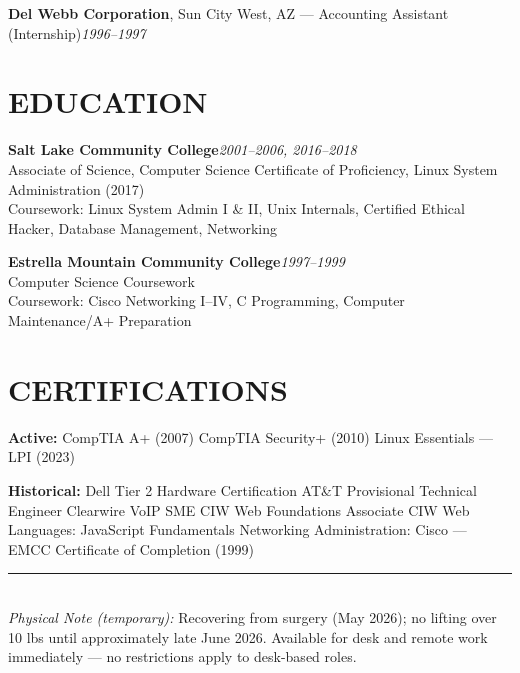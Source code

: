 \documentclass[9pt,letterpaper]{extarticle}
\begin{document}
\vspace{3pt}
\noindent\textbf{Del Webb Corporation}, Sun City West, AZ --- Accounting Assistant (Internship)\hfill\textit{1996--1997}

\section*{EDUCATION}

\noindent\textbf{Salt Lake Community College}\hfill\textit{2001--2006, 2016--2018}\\
Associate of Science, Computer Science \textbullet{} Certificate of Proficiency, Linux System Administration (2017)\\
Coursework: Linux System Admin I \& II, Unix Internals, Certified Ethical Hacker, Database Management, Networking

\vspace{4pt}
\noindent\textbf{Estrella Mountain Community College}\hfill\textit{1997--1999}\\
Computer Science Coursework\\
Coursework: Cisco Networking I--IV, C Programming, Computer Maintenance/A+ Preparation

\section*{CERTIFICATIONS}

\textbf{Active:} CompTIA A+ (2007) \textbullet{} CompTIA Security+ (2010) \textbullet{} Linux Essentials --- LPI (2023)

\textbf{Historical:} Dell Tier 2 Hardware Certification \textbullet{} AT\&T Provisional Technical Engineer \textbullet{} Clearwire VoIP SME \textbullet{} CIW Web Foundations Associate \textbullet{} CIW Web Languages: JavaScript Fundamentals \textbullet{} Networking Administration: Cisco --- EMCC Certificate of Completion (1999)

\vspace{8pt}
\noindent\rule{\linewidth}{0.4pt}
\vspace{3pt}
\\[2pt]
{\small\textit{Physical Note (temporary):} Recovering from surgery (May 2026); no lifting over 10 lbs until approximately late June 2026. Available for desk and remote work immediately --- no restrictions apply to desk-based roles.}
\end{document}
